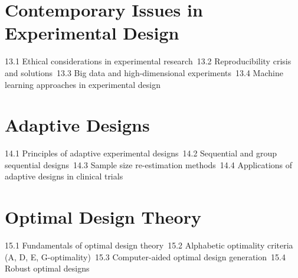 \section{Contemporary Issues in Experimental Design}
13.1 Ethical considerations in experimental research\
13.2 Reproducibility crisis and solutions\
13.3 Big data and high-dimensional experiments\
13.4 Machine learning approaches in experimental design\
\section{Adaptive Designs}
14.1 Principles of adaptive experimental designs\
14.2 Sequential and group sequential designs\
14.3 Sample size re-estimation methods\
14.4 Applications of adaptive designs in clinical trials\
\section{Optimal Design Theory}
15.1 Fundamentals of optimal design theory\
15.2 Alphabetic optimality criteria (A, D, E, G-optimality)\
15.3 Computer-aided optimal design generation\
15.4 Robust optimal designs\
